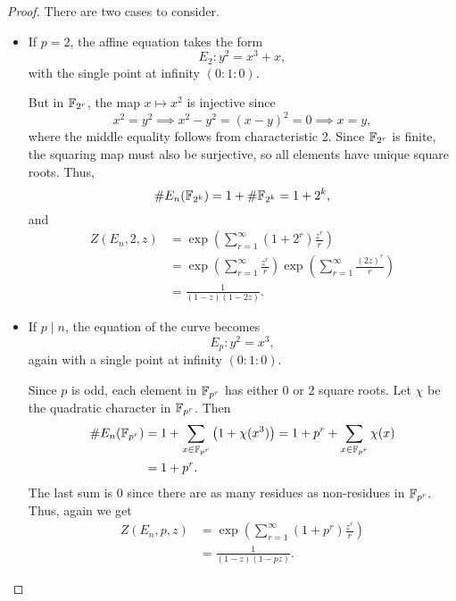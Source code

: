 \documentclass[12pt, a4paper]{report}
\begin{document}
\begin{proof}
  There are two cases to consider.
  \begin{itemize}
  \item If $p = 2$, the affine equation takes the form
    \[E_2: y^2 = x^3 + x,\] with the single point at infinity $(0:1:0).$

    But in $\mathbb{F}_{2^r}$, the map $x \mapsto x^2$ is injective since
    \[x^2 = y^2 \implies x^2-y^2 = (x-y)^2 = 0 \implies x = y,\] where the
    middle equality follows from characteristic 2. Since
    $\mathbb{F}_{2^r}$ is finite, the squaring map must also be surjective, so all
    elements have unique square roots. Thus,
    \[\# E_n(\mathbb{F}_{2^k}) = 1 + \# \mathbb{F}_{2^k} = 1 + 2^{k},\] and
    \begin{equation*}
      \begin{split}
        Z(E_n,2,z) &= \exp \left( \sum\limits_{r=1}^\infty (1 + 2^r)\frac{z^r}{r}
                     \right) \\
                   &= \exp \left( \sum\limits_{r=1}^\infty \frac{z^r}{r} \right) 
                     \exp \left( \sum\limits_{r=1}^\infty \frac{(2z)^r}{r} \right) \\
                   &= \frac{1}{(1-z)(1-2z)}.
      \end{split}
    \end{equation*}
  \item If $p \mid n$, the equation of the curve becomes
    \[E_p: y^2 = x^3,\]
    again with a single point at infinity $(0:1:0)$.

    Since $p$ is odd, each element in $\mathbb{F}_{p^r}$ has either 0 or 2 square
    roots. Let $\chi$ be the quadratic character in $\mathbb{F}_{p^r}$. Then
    \begin{equation*}
      \begin{split}
        \# E_n(\mathbb{F}_{p^r}) &= 1 + \sum\limits_{x \in \mathbb{F}_{p^r}}
        \left( 1 + \chi(x^3) \right) = 1 + p^r + \sum\limits_{x \in \mathbb{F}_{p^r}}
                            \chi(x)  \\
                          &= 1 + p^r.
      \end{split}
    \end{equation*}
    The last sum is 0 since there are as many residues as non-residues in $\mathbb{F}_{p^r}.$ 
    Thus, again we get
    \begin{equation*}
      \begin{split}
        Z(E_n, p, z) &= \exp \left(\sum\limits_{r=1}^\infty (1+p^r) \frac{z^r}{r}\right) \\
                     &= \frac{1}{(1-z)(1-pz)}.
      \end{split}
    \end{equation*}
    
  \end{itemize}
  
  
\end{proof}
\end{document}
